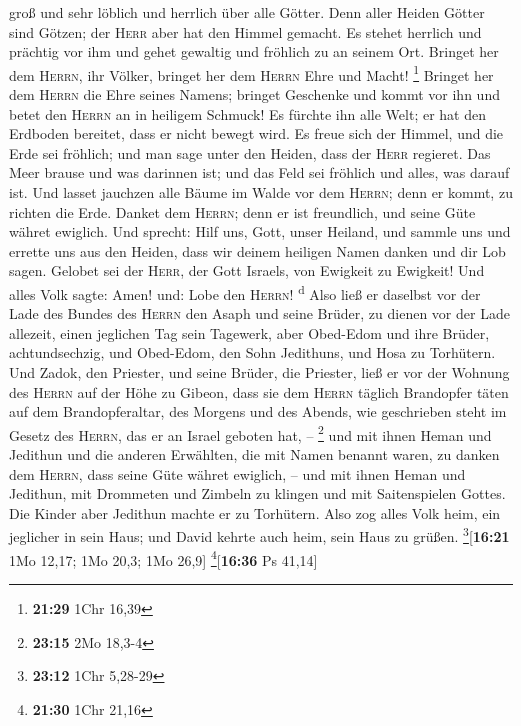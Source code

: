 groß und sehr löblich und herrlich über alle Götter. 
Denn aller Heiden Götter sind Götzen; der \textsc{Herr} aber hat den
Himmel gemacht.  Es stehet herrlich und prächtig vor ihm
und gehet gewaltig und fröhlich zu an seinem Ort. 
Bringet her dem \textsc{Herrn}, ihr Völker, bringet her dem
\textsc{Herrn} Ehre und Macht! \footnote{\textbf{21:29} 1Chr 16,39}
 Bringet her dem \textsc{Herrn} die Ehre seines Namens;
bringet Geschenke und kommt vor ihn und betet den \textsc{Herrn} an in
heiligem Schmuck!  Es fürchte ihn alle Welt; er hat den
Erdboden bereitet, dass er nicht bewegt wird.  Es freue
sich der Himmel, und die Erde sei fröhlich; und man sage unter den
Heiden, dass der \textsc{Herr} regieret.  Das Meer brause
und was darinnen ist; und das Feld sei fröhlich und alles, was darauf
ist.  Und lasset jauchzen alle Bäume im Walde vor dem
\textsc{Herrn}; denn er kommt, zu richten die Erde. 
Danket dem \textsc{Herrn}; denn er ist freundlich, und seine Güte währet
ewiglich.  Und sprecht: Hilf uns, Gott, unser Heiland,
und sammle uns und errette uns aus den Heiden, dass wir deinem heiligen
Namen danken und dir Lob sagen.  Gelobet sei der
\textsc{Herr}, der Gott Israels, von Ewigkeit zu Ewigkeit! Und alles
Volk sagte: Amen! und: Lobe den \textsc{Herrn}! \textsuperscript{d}
 Also ließ er daselbst vor der Lade des Bundes des
\textsc{Herrn} den Asaph und seine Brüder, zu dienen vor der Lade
allezeit, einen jeglichen Tag sein Tagewerk,  aber
Obed-Edom und ihre Brüder, achtundsechzig, und Obed-Edom, den Sohn
Jedithuns, und Hosa zu Torhütern.  Und Zadok, den
Priester, und seine Brüder, die Priester, ließ er vor der Wohnung des
\textsc{Herrn} auf der Höhe zu Gibeon,  dass sie dem
\textsc{Herrn} täglich Brandopfer täten auf dem Brandopferaltar, des
Morgens und des Abends, wie geschrieben steht im Gesetz des
\textsc{Herrn}, das er an Israel geboten hat, -- \footnote{\textbf{23:15}
  2Mo 18,3-4}  und mit ihnen Heman und Jedithun und die
anderen Erwählten, die mit Namen benannt waren, zu danken dem
\textsc{Herrn}, dass seine Güte währet ewiglich, --  und
mit ihnen Heman und Jedithun, mit Drommeten und Zimbeln zu klingen und
mit Saitenspielen Gottes. Die Kinder aber Jedithun machte er zu
Torhütern.  Also zog alles Volk heim, ein jeglicher in
sein Haus; und David kehrte auch heim, sein Haus zu grüßen.
\footnote{\textbf{23:12} 1Chr 5,28-29}{[}\textbf{16:21} 1Mo 12,17; 1Mo
20,3; 1Mo 26,9{]} \footnote{\textbf{21:30} 1Chr 21,16}{[}\textbf{16:36}
Ps 41,14{]}

